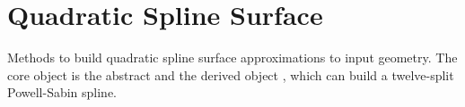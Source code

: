 \chapter{Quadratic Spline Surface}
\hypertarget{md_src_2quadratic__spline__surface_2_r_e_a_d_m_e}{}\label{md_src_2quadratic__spline__surface_2_r_e_a_d_m_e}
\label{md_src_2quadratic__spline__surface_2_r_e_a_d_m_e_autotoc_md2}%
%
 Methods to build quadratic spline surface approximations to input geometry. The core object is the abstract {\ttfamily {}} and the derived object {\ttfamily {}}, which can build a twelve-\/split Powell-\/\+Sabin spline. 